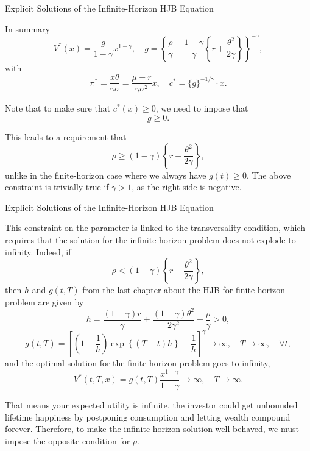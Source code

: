\documentclass{beamer}
\begin{document}
\begin{frame}{Explicit Solutions of the Infinite-Horizon HJB Equation}

    {\footnotesize \footnotesize
     In summary
\[
V^*(x) = \frac{g}{1 - \gamma} x^{1-\gamma}, \quad g = \left\{ \frac{\rho}{\gamma} - \frac{1 - \gamma}{\gamma} \left\{ r + \frac{\theta^2}{2\gamma} \right\} \right\}^{-\gamma},
\]
with
\[
\pi^* = \frac{x\theta}{\gamma\sigma} = \frac{\mu - r}{\gamma\sigma^2}x, \quad c^* = \{ g \}^{-1/\gamma} \cdot x.
\]

Note that to make sure that \( c^*(x) \geq 0 \), we need to impose that
\[
g \geq 0.
\]

 \pause This leads to a requirement that
\[
\rho \geq (1 - \gamma) \left\{ r + \frac{\theta^2}{2\gamma} \right\},
\]
unlike in the finite-horizon case where we always have \( g(t) \geq 0 \). The above constraint is trivially true if \( \gamma > 1 \), as the right side is negative.

    }
\end{frame}

\begin{frame}{Explicit Solutions of the Infinite-Horizon HJB Equation}

    {\footnotesize \footnotesize
    This constraint on the parameter is linked to the transversality condition, which requires that the solution for the infinite horizon problem does not explode to infinity. Indeed, if
\[
\rho < (1 - \gamma) \left\{ r + \frac{\theta^2}{2\gamma} \right\},
\]
 \pause then \( h \) and \( g(t, T) \) from the last chapter about the HJB for finite horizon problem are given by
\[
h = \frac{(1 - \gamma)r}{\gamma} + \frac{(1 - \gamma)\theta^2}{2\gamma^2} - \frac{\rho}{\gamma} > 0,
\]
\[
g(t, T) = \left[ \left( 1 + \frac{1}{h} \right) \exp \left\{ (T - t)h \right\} - \frac{1}{h} \right]^{\gamma} \to \infty, \quad T \to \infty, \quad \forall t,
\]
and the optimal solution for the finite horizon problem goes to infinity,
\[
V^*(t, T, x) = g(t, T) \frac{x^{1 - \gamma}}{1 - \gamma} \to \infty, \quad T \to \infty.
\]
\par \pause  That means your expected utility is infinite,
the investor could get unbounded lifetime happiness by postponing consumption and letting wealth compound forever. 
Therefore, to make the infinite-horizon solution well-behaved, we must impose the opposite condition for $\rho$.
    }
\end{frame}
\end{document}
